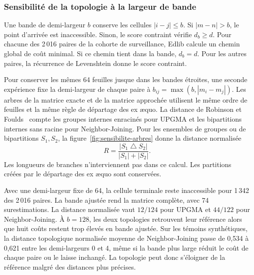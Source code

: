 \subsubsection{Sensibilité de la topologie à la largeur de bande}\label{sec:sensibilite-arbres}
Une bande de demi-largeur \(b\) conserve les cellules \(|i-j|\le b\). Si \(|m-n|>b\), le point d’arrivée est inaccessible. Sinon, le score contraint vérifie \(d_b\ge d\). Pour chacune des 2\,016 paires de la cohorte de surveillance, Edlib calcule un chemin global de coût minimal. Si ce chemin tient dans la bande, \(d_b=d\). Pour les autres paires, la récurrence de Levenshtein donne le score contraint.

Pour conserver les mêmes 64 feuilles jusque dans les bandes étroites, une seconde expérience fixe la demi-largeur de chaque paire à \(b_{ij}=\max(b,|m_i-m_j|)\). Les arbres de la matrice exacte et de la matrice approchée utilisent le même ordre de feuilles et la même règle de départage des ex æquo. La distance de Robinson et Foulds~\cite{robinson} compte les groupes internes enracinés pour UPGMA et les bipartitions internes sans racine pour Neighbor-Joining. Pour les ensembles de groupes ou de bipartitions \(S_1,S_2\), la figure~\ref{fig:sensibilite-arbres} donne la distance normalisée
\[
 R=\frac{|S_1\mathbin{\triangle}S_2|}{|S_1|+|S_2|}.
\]
Les longueurs de branches n'interviennent pas dans ce calcul. Les partitions créées par le départage des ex æquo sont conservées.

Avec une demi-largeur fixe de 64, la cellule terminale reste inaccessible pour 1\,342 des 2\,016 paires. La bande ajustée rend la matrice complète, avec 74 surestimations. La distance normalisée vaut \(12/124\) pour UPGMA et \(44/122\) pour Neighbor-Joining. À \(b=128\), les deux topologies retrouvent leur référence alors que huit coûts restent trop élevés en bande ajustée. Sur les témoins synthétiques, la distance topologique normalisée moyenne de Neighbor-Joining passe de 0,534 à 0,621 entre les demi-largeurs 0 et 4, même si la bande plus large réduit le coût de chaque paire ou le laisse inchangé. La topologie peut donc s’éloigner de la référence malgré des distances plus précises.

